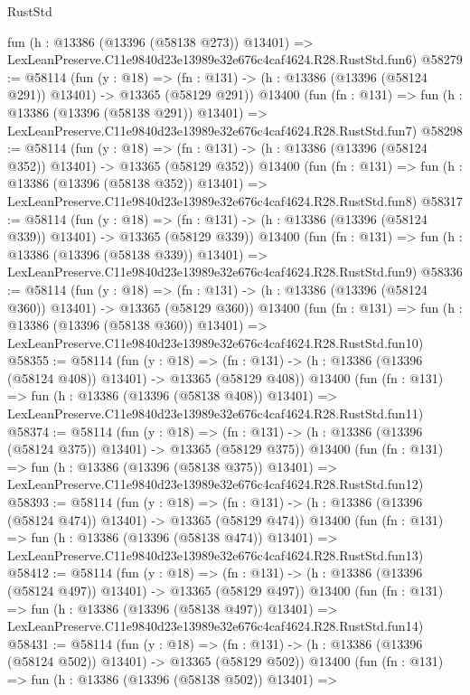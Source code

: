 \begin{lexlean}{RustStd}
\begin{coremodule}
    fun (h : @13386 (@13396 (@58138 @273)) @13401) =>
    LexLeanPreserve.C11e9840d23e13989e32e676c4caf4624.R28.RustStd.fun6)
@58279 := @58114
    (fun (y : @18) =>
    (fn : @131) -> (h : @13386 (@13396 (@58124 @291)) @13401) -> @13365 (@58129 @291))
    @13400
    (fun (fn : @131) =>
    fun (h : @13386 (@13396 (@58138 @291)) @13401) =>
    LexLeanPreserve.C11e9840d23e13989e32e676c4caf4624.R28.RustStd.fun7)
@58298 := @58114
    (fun (y : @18) =>
    (fn : @131) -> (h : @13386 (@13396 (@58124 @352)) @13401) -> @13365 (@58129 @352))
    @13400
    (fun (fn : @131) =>
    fun (h : @13386 (@13396 (@58138 @352)) @13401) =>
    LexLeanPreserve.C11e9840d23e13989e32e676c4caf4624.R28.RustStd.fun8)
@58317 := @58114
    (fun (y : @18) =>
    (fn : @131) -> (h : @13386 (@13396 (@58124 @339)) @13401) -> @13365 (@58129 @339))
    @13400
    (fun (fn : @131) =>
    fun (h : @13386 (@13396 (@58138 @339)) @13401) =>
    LexLeanPreserve.C11e9840d23e13989e32e676c4caf4624.R28.RustStd.fun9)
@58336 := @58114
    (fun (y : @18) =>
    (fn : @131) -> (h : @13386 (@13396 (@58124 @360)) @13401) -> @13365 (@58129 @360))
    @13400
    (fun (fn : @131) =>
    fun (h : @13386 (@13396 (@58138 @360)) @13401) =>
    LexLeanPreserve.C11e9840d23e13989e32e676c4caf4624.R28.RustStd.fun10)
@58355 := @58114
    (fun (y : @18) =>
    (fn : @131) -> (h : @13386 (@13396 (@58124 @408)) @13401) -> @13365 (@58129 @408))
    @13400
    (fun (fn : @131) =>
    fun (h : @13386 (@13396 (@58138 @408)) @13401) =>
    LexLeanPreserve.C11e9840d23e13989e32e676c4caf4624.R28.RustStd.fun11)
@58374 := @58114
    (fun (y : @18) =>
    (fn : @131) -> (h : @13386 (@13396 (@58124 @375)) @13401) -> @13365 (@58129 @375))
    @13400
    (fun (fn : @131) =>
    fun (h : @13386 (@13396 (@58138 @375)) @13401) =>
    LexLeanPreserve.C11e9840d23e13989e32e676c4caf4624.R28.RustStd.fun12)
@58393 := @58114
    (fun (y : @18) =>
    (fn : @131) -> (h : @13386 (@13396 (@58124 @474)) @13401) -> @13365 (@58129 @474))
    @13400
    (fun (fn : @131) =>
    fun (h : @13386 (@13396 (@58138 @474)) @13401) =>
    LexLeanPreserve.C11e9840d23e13989e32e676c4caf4624.R28.RustStd.fun13)
@58412 := @58114
    (fun (y : @18) =>
    (fn : @131) -> (h : @13386 (@13396 (@58124 @497)) @13401) -> @13365 (@58129 @497))
    @13400
    (fun (fn : @131) =>
    fun (h : @13386 (@13396 (@58138 @497)) @13401) =>
    LexLeanPreserve.C11e9840d23e13989e32e676c4caf4624.R28.RustStd.fun14)
@58431 := @58114
    (fun (y : @18) =>
    (fn : @131) -> (h : @13386 (@13396 (@58124 @502)) @13401) -> @13365 (@58129 @502))
    @13400
    (fun (fn : @131) =>
    fun (h : @13386 (@13396 (@58138 @502)) @13401) =>

\end{coremodule}
\end{lexlean}
